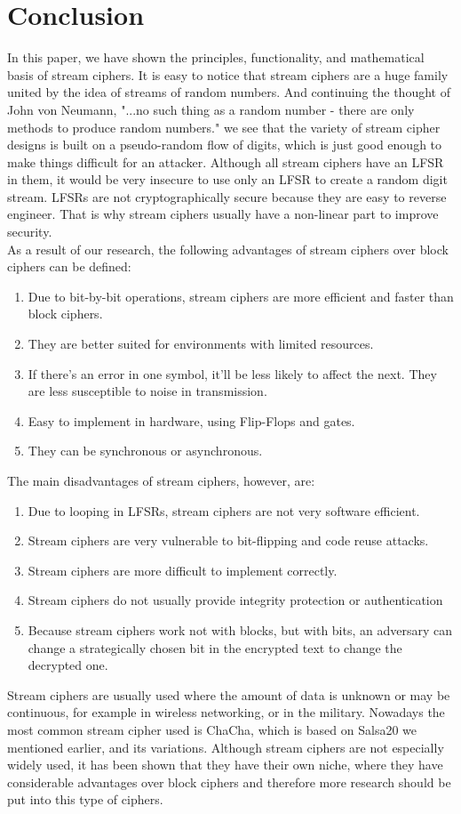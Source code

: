 \section{Conclusion}
In this paper, we have shown the principles, functionality, and mathematical basis of stream ciphers. It is easy to notice that stream ciphers are a huge family united by the idea of streams of random numbers. And continuing the thought of John von Neumann, "...no such thing as a random number - there are only methods to produce random numbers." \cite[p.~36]{vonNeumann1951} we see that the variety of stream cipher designs is built on a pseudo-random flow of digits, which is just good enough to make things difficult for an attacker. Although all stream ciphers have an LFSR in them, it would be very insecure to use only an LFSR to create a random digit stream. LFSRs are not cryptographically secure because they are easy to reverse engineer. That is why stream ciphers usually have a non-linear part to improve security.\\
As a result of our research, the following advantages of stream ciphers over block ciphers can be defined:
\begin{enumerate}
	\setlength\itemsep{0.1em}
	\item Due to bit-by-bit operations, stream ciphers are more efficient and faster than block ciphers.
	\item They are better suited for environments with limited resources. 
	\item If there’s an error in one symbol, it’ll be less likely to affect the next. They are less susceptible to noise in transmission.
	\item Easy to implement in hardware, using Flip-Flops and gates.
	\item They can be synchronous or asynchronous.
\end{enumerate}
The main disadvantages of stream ciphers, however, are:
\begin{enumerate}
	\setlength\itemsep{0.1em}
	\item Due to looping in LFSRs, stream ciphers are not very software efficient.
	\item Stream ciphers are very vulnerable to bit-flipping and code reuse attacks. 
	\item Stream ciphers are more difficult to implement correctly.
	\item Stream ciphers do not usually provide integrity protection or authentication
	\item Because stream ciphers work not with blocks, but with bits, an adversary can change a strategically chosen bit in the encrypted text to change the decrypted one.
\end{enumerate}

Stream ciphers are usually used where the amount of data is unknown or may be continuous, for example in wireless networking, or in the military. Nowadays the most common stream cipher used is ChaCha, which is based on Salsa20 we mentioned earlier, and its variations. 
Although stream ciphers are not especially widely used, it has been shown that they have their own niche, where they have considerable advantages over block ciphers and therefore more research should be put into this type of ciphers.
\clearpage